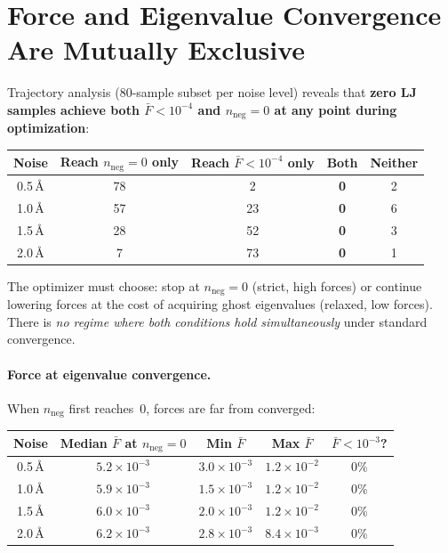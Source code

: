 \documentclass[11pt,a4paper]{article}
\theoremstyle{definition}
\begin{document}
\section{Force and Eigenvalue Convergence Are Mutually Exclusive}
\label{sec:mutual-exclusivity}

Trajectory analysis (80-sample subset per noise level) reveals that
\textbf{zero LJ samples achieve both $\bar{F} < 10^{-4}$ and
$n_\text{neg}{=}0$ at any point during optimization}:

\begin{center}\small
\begin{tabular}{c cccc}
\toprule
Noise & Reach $n_\text{neg}{=}0$ only & Reach $\bar{F}{<}10^{-4}$ only
  & Both & Neither \\
\midrule
0.5\,\AA & 78 & 2  & \textbf{0} & 2 \\
1.0\,\AA & 57 & 23 & \textbf{0} & 6 \\
1.5\,\AA & 28 & 52 & \textbf{0} & 3 \\
2.0\,\AA & 7  & 73 & \textbf{0} & 1 \\
\bottomrule
\end{tabular}
\end{center}

\noindent
The optimizer must choose: stop at $n_\text{neg}{=}0$ (strict, high forces)
or continue lowering forces at the cost of acquiring ghost eigenvalues
(relaxed, low forces).  There is \emph{no regime where both conditions
hold simultaneously} under standard convergence.

\paragraph{Force at eigenvalue convergence.}
When $n_\text{neg}$ first reaches~0, forces are far from converged:

\begin{center}\small
\begin{tabular}{c cccc}
\toprule
Noise & Median $\bar{F}$ at $n_\text{neg}{=}0$ & Min $\bar{F}$ & Max $\bar{F}$
  & $\bar{F} < 10^{-3}$? \\
\midrule
0.5\,\AA & $5.2 \times 10^{-3}$ & $3.0 \times 10^{-3}$ & $1.2 \times 10^{-2}$ & 0\% \\
1.0\,\AA & $5.9 \times 10^{-3}$ & $1.5 \times 10^{-3}$ & $1.2 \times 10^{-2}$ & 0\% \\
1.5\,\AA & $6.0 \times 10^{-3}$ & $2.0 \times 10^{-3}$ & $1.2 \times 10^{-2}$ & 0\% \\
2.0\,\AA & $6.2 \times 10^{-3}$ & $2.8 \times 10^{-3}$ & $8.4 \times 10^{-3}$ & 0\% \\
\bottomrule
\end{tabular}
\end{center}
\end{document}

